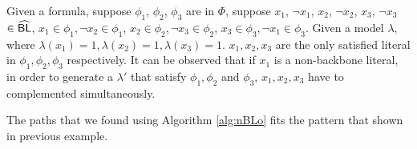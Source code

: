 \begin{example}
Given a formula, suppose $\phi_1$, $\phi_2$, $\phi_3$ are in $\Phi$, suppose $x_1$, $\neg x_1$, $x_2$, $\neg x_2$, $x_3$, $\neg x_3$ $\in{\sf \widehat{BL}}$, $x_1\in\phi_1, \neg x_2\in\phi_1$, $x_2\in\phi_2, \neg x_3\in\phi_2$, $x_3\in\phi_3, \neg x_1\in\phi_3$.
Given a model $\lambda$, where $\lambda(x_1)=1, \lambda(x_2)=1, \lambda(x_3)=1$. $x_1, x_2, x_3$ are the only satisfied literal in $\phi_1, \phi_2, \phi_3$ respectively.
It can be observed that if $x_1$ is a non-backbone literal, in order to generate a $\lambda'$ that satisfy $\phi_1, \phi_2$ and $\phi_3$, $x_1, x_2, x_3$ have to complemented simultaneously.
\end{example}

The paths that we found using Algorithm \ref{alg:nBLo} fits the pattern that shown in previous example.

